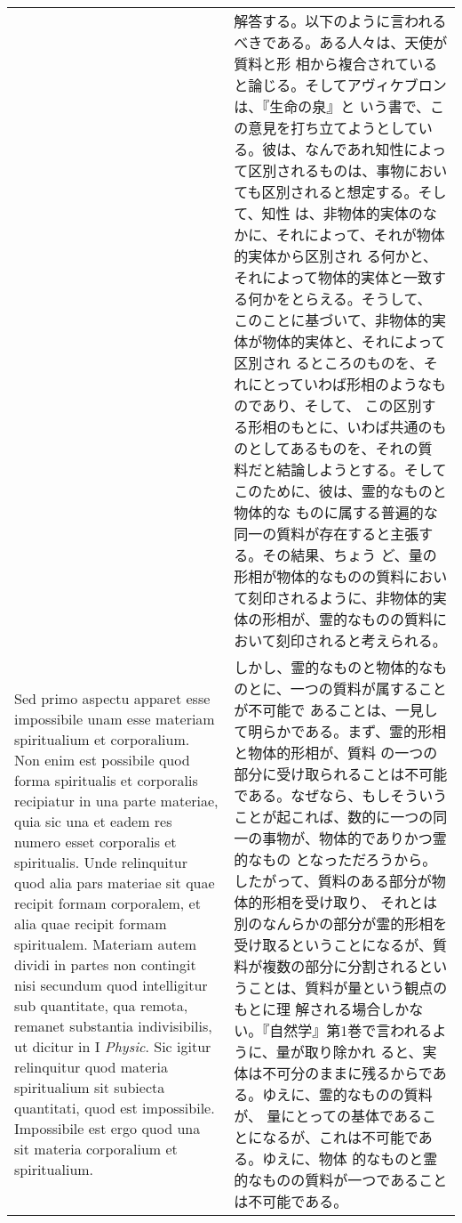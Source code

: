 \documentclass[10pt]{jsarticle} %
\begin{document}
\begin{longtable}{p{21em}p{21em}}
&

 解答する。以下のように言われるべきである。ある人々は、天使が質料と形
 相から複合されていると論じる。そしてアヴィケブロンは、『生命の泉』と
 いう書で、この意見を打ち立てようとしている。彼は、なんであれ知性によっ
 て区別されるものは、事物においても区別されると想定する。そして、知性
 は、非物体的実体のなかに、それによって、それが物体的実体から区別され
 る何かと、それによって物体的実体と一致する何かをとらえる。そうして、
 このことに基づいて、非物体的実体が物体的実体と、それによって区別され
 るところのものを、それにとっていわば形相のようなものであり、そして、
 この区別する形相のもとに、いわば共通のものとしてあるものを、それの質
 料だと結論しようとする。そしてこのために、彼は、霊的なものと物体的な
 ものに属する普遍的な同一の質料が存在すると主張する。その結果、ちょう
 ど、量の形相が物体的なものの質料において刻印されるように、非物体的実
 体の形相が、霊的なものの質料において刻印されると考えられる。

\\

Sed primo aspectu apparet esse impossibile unam esse materiam
spiritualium et corporalium. Non enim est possibile quod forma
spiritualis et corporalis recipiatur in una parte materiae, quia sic una
et eadem res numero esset corporalis et spiritualis. Unde relinquitur
quod alia pars materiae sit quae recipit formam corporalem, et alia quae
recipit formam spiritualem. Materiam autem dividi in partes non
contingit nisi secundum quod intelligitur sub quantitate, qua remota,
remanet substantia indivisibilis, ut dicitur in I {\itshape Physic}. Sic
igitur relinquitur quod materia spiritualium sit subiecta quantitati,
quod est impossibile. Impossibile est ergo quod una sit materia
corporalium et spiritualium.


&

しかし、霊的なものと物体的なものとに、一つの質料が属することが不可能で
 あることは、一見して明らかである。まず、霊的形相と物体的形相が、質料
 の一つの部分に受け取られることは不可能である。なぜなら、もしそういう
 ことが起これば、数的に一つの同一の事物が、物体的でありかつ霊的なもの
 となっただろうから。したがって、質料のある部分が物体的形相を受け取り、
 それとは別のなんらかの部分が霊的形相を受け取るということになるが、質
 料が複数の部分に分割されるということは、質料が量という観点のもとに理
 解される場合しかない。『自然学』第1巻で言われるように、量が取り除かれ
 ると、実体は不可分のままに残るからである。ゆえに、霊的なものの質料が、
 量にとっての基体であることになるが、これは不可能である。ゆえに、物体
 的なものと霊的なものの質料が一つであることは不可能である。



\end{longtable}
\end{document}
